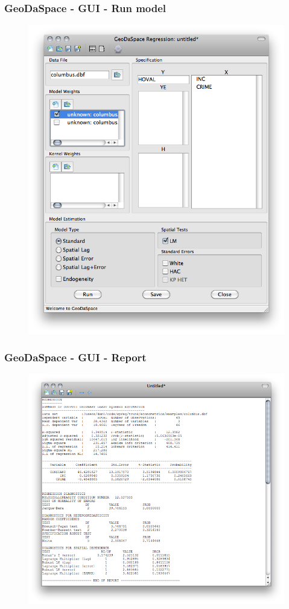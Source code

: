 \documentclass[nototal]{beamer}
\begin{document}
\begin{frame}
	\frametitle{GeoDaSpace - GUI - Run model}
  \begin{figure}
  \includegraphics[scale=0.25]{figs/gs4-spec.png}
  \end{figure}
 \end{frame} 

\begin{frame}
	\frametitle{GeoDaSpace - GUI - Report}
  \begin{figure}
  \includegraphics[scale=0.30]{figs/gs5-report.png}
  \end{figure}
 \end{frame} 
\end{document}
